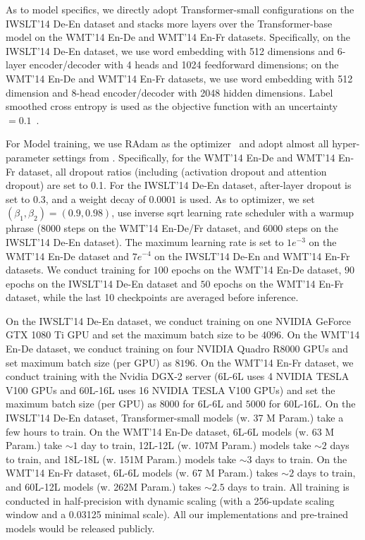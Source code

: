 As to model specifics, we directly adopt Transformer-small configurations on the IWSLT'14 De-En dataset and stacks more layers over the Transformer-base model on the WMT'14 En-De and WMT'14 En-Fr datasets.
Specifically, on the IWSLT'14 De-En dataset, we use word embedding with 512 dimensions and 6-layer encoder/decoder with 4 heads and 1024 feedforward dimensions; on the WMT'14 En-De and WMT'14 En-Fr datasets, we use word embedding with 512 dimension and 8-head encoder/decoder with 2048 hidden dimensions. 
Label smoothed cross entropy is used as the objective function with an uncertainty $= 0.1$~\citep{szegedy2016rethinking}. 

For Model training, we use RAdam as the optimizer~\cite{Liu2019OnTV} and adopt almost all hyper-parameter settings from \citet{lu2020understanding}.
Specifically, for the WMT'14 En-De and WMT'14 En-Fr dataset, all dropout ratios (including (activation dropout and attention dropout) are set to 0.1. 
For the IWSLT'14 De-En dataset, after-layer dropout is set to $0.3$, and a weight decay of $0.0001$ is used. 
As to optimizer, we set $(\beta_1, \beta_2) = (0.9, 0.98)$,  use inverse sqrt learning rate scheduler with a warmup phrase (8000 steps on the WMT'14 En-De/Fr dataset, and 6000 steps on the IWSLT'14 De-En dataset). 
The maximum learning rate is set to $1e^{-3}$ on the WMT'14 En-De dataset and $7e^{-4}$ on the IWSLT'14 De-En and WMT'14 En-Fr datasets. 
We conduct training for $100$ epochs on the WMT'14 En-De dataset, $90$ epochs on the IWSLT'14 De-En dataset and $50$ epochs on the WMT'14 En-Fr dataset, while the last 10 checkpoints are averaged before inference. 

On the IWSLT'14 De-En dataset, we conduct training on one NVIDIA GeForce GTX 1080 Ti GPU and set the maximum batch size to be $4096$. 
On the WMT'14 En-De dataset, we conduct training on four NVIDIA Quadro R8000 GPUs and set maximum batch size (per GPU) as $8196$. 
On the WMT'14 En-Fr dataset, we conduct training with the Nvidia DGX-2 server (6L-6L uses 4 NVIDIA TESLA V100 GPUs and 60L-16L uses 16 NVIDIA TESLA V100 GPUs) and set the maximum batch size (per GPU) as $8000$ for 6L-6L and $5000$ for 60L-16L. 
On the IWSLT'14 De-En dataset, Transformer-small models (w. 37 M Param.) take a few hours to train.
On the WMT'14 En-De dataset, 6L-6L models (w. 63 M Param.) take $\sim1$ day to train, 
12L-12L (w. 107M Param.) models take $\sim2$ days to train, 
and 18L-18L (w. 151M Param.) models take $\sim3$ days to train. 
On the WMT'14 En-Fr dataset, 6L-6L models (w. 67 M Param.) takes $\sim2$ days to train, and 60L-12L models (w. 262M Param.) takes $\sim 2.5$ days to train. 
All training is conducted in half-precision with dynamic scaling (with a 256-update scaling window and a 0.03125 minimal scale).
All our implementations and pre-trained models would be released publicly. 

